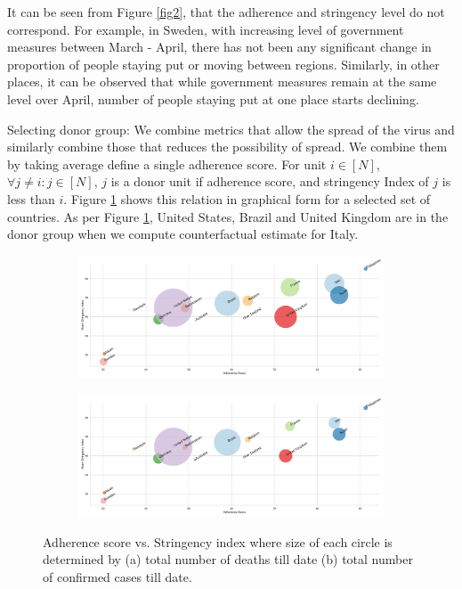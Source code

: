 \documentclass[final,authoryear,5p,times,twocolumn]{elsarticle}
\begin{document}
    It can be seen from Figure \ref{fig2}, that the adherence  and stringency level do not correspond. For example, in Sweden, with increasing level of government measures between March - April, there has not been any significant change in proportion of people staying put or moving between regions. Similarly, in other places, it can be observed that while government measures remain at the same level over April, number of people staying put at one place starts declining. 
    
    Selecting donor group: We combine metrics that allow the spread of the virus and similarly combine those that reduces the possibility of spread. We combine them by taking average define a single adherence score. For unit $i \in [N]$, $\forall j \neq i : j \in [N]$, $j$ is a donor unit if adherence score, and stringency Index of $j$ is less than $i$. Figure \ref{fig3} shows this relation in graphical form for a selected set of countries. As per Figure \ref{fig3}, United States, Brazil and United Kingdom are in the donor group when we compute counterfactual estimate for Italy. 
    
    \begin{figure}
    	\centering
    	\begin{subfigure}[b]{\textwidth}
    		\centering
    		\includegraphics[width=0.7\linewidth]{FIG7}
    	\end{subfigure}
    	
    	\begin{subfigure}[b]{\textwidth}
    		\centering
    		\includegraphics[width=0.7\linewidth]{FIG8}
    	\end{subfigure}
    	
    	\caption[Mobility Trends]{Adherence score vs. Stringency index where size of each circle is determined by (a) total number of deaths till date (b) total number of confirmed cases till date.}
    	\label{fig3} 
    \end{figure}
\end{document}
